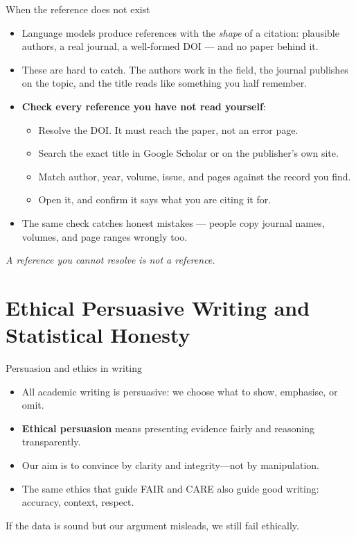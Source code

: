 \documentclass[aspectratio=169]{beamer}
\begin{document}
\begin{frame}{When the reference does not exist}
\begin{itemize}
  \item Language models produce references with the \emph{shape} of a
    citation: plausible authors, a real journal, a well-formed DOI --- and no
    paper behind it.
  \item These are hard to catch.  The authors work in the field, the journal
    publishes on the topic, and the title reads like something you half
    remember.
  \item \textbf{Check every reference you have not read yourself}:
    \begin{itemize}
      \item Resolve the DOI.  It must reach the paper, not an error page.
      \item Search the exact title in Google Scholar or on the publisher's
        own site.
      \item Match author, year, volume, issue, and pages against the record
        you find.
      \item Open it, and confirm it says what you are citing it for.
    \end{itemize}
  \item The same check catches honest mistakes --- people copy journal names,
    volumes, and page ranges wrongly too.
\end{itemize}
\medskip
\textit{A reference you cannot resolve is not a reference.}
\end{frame}

\section{Ethical Persuasive Writing and Statistical Honesty}

\begin{frame}{Persuasion and ethics in writing}
\begin{itemize}
  \item All academic writing is persuasive: we choose what to show, emphasise, or omit.  
  \item \textbf{Ethical persuasion} means presenting evidence fairly and reasoning transparently.  
  \item Our aim is to convince by clarity and integrity—not by manipulation.  
  \item The same ethics that guide FAIR and CARE also guide good writing: accuracy, context, respect.
\end{itemize}
\medskip
If the data is sound but our argument misleads, we still fail ethically.
\end{frame}
\end{document}
